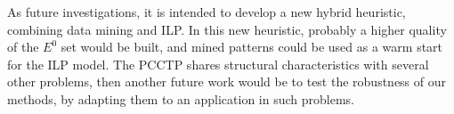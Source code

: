 \documentclass{singlecol-new}
\theoremstyle{TH}{
\newtheorem{lemma}{Lemma}
\newtheorem{theorem}[lemma]{Theorem}
\newtheorem{corrolary}[lemma]{Corrolary}
\newtheorem{conjecture}[lemma]{Conjecture}
\newtheorem{proposition}[lemma]{Proposition}
\newtheorem{claim}[lemma]{Claim}
\newtheorem{stheorem}[lemma]{Wrong Theorem}
}
\theoremstyle{THrm}{
\newtheorem{definition}{Definition}[section]
\newtheorem{question}{Question}[section]
\newtheorem{remark}{Remark}
\newtheorem{scheme}{Scheme}
}
\theoremstyle{THhit}{
\newtheorem{case}{Case}[section]
}
\begin{document}
As future investigations, it is intended to develop a new hybrid heuristic, combining data mining and ILP. In this new heuristic, probably a higher quality of the $E^0 $ set would be built, and mined patterns could be used as a warm start for the ILP model. The PCCTP shares structural characteristics with several other problems, then another future work would be to test the robustness of our methods, by adapting them to an application in such problems.




\end{document}
